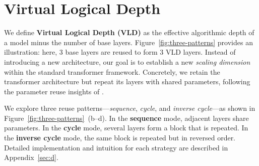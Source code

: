 \documentclass{article} %
\begin{document}
\section{Virtual Logical Depth}
\label{sec:vld}


We define \textbf{Virtual Logical Depth (VLD)} as the effective algorithmic depth of a model minus the number of base layers. Figure~\ref{fig:three-patterns} provides an illustration: here, 3 base layers are reused to form 3 VLD layers. Instead of introducing a new architecture, our goal is to establish a new \emph{scaling dimension} within the standard transformer framework. Concretely, we retain the transformer architecture but repeat its layers with shared parameters, following the parameter reuse insights of \citet{takase2021lessons}. 

We explore three reuse patterns—\emph{sequence}, \emph{cycle}, and \emph{inverse cycle}—as shown in Figure~\ref{fig:three-patterns}~(b–d). In the \textbf{sequence} mode, adjacent layers share parameters. In the \textbf{cycle} mode, several layers form a block that is repeated. In the \textbf{inverse cycle} mode, the same block is repeated but in reversed order. Detailed implementation and intuition for each strategy are described in Appendix~\ref{sec:d}.
\end{document}
